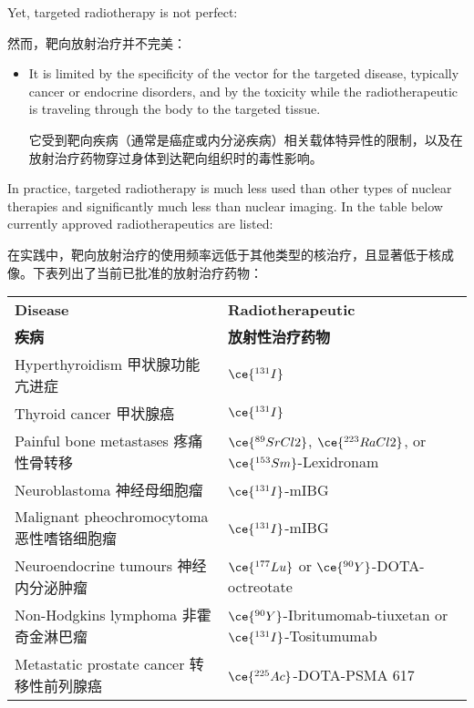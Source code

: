 \documentclass[dvipsnames, svgnames,a4paper,11pt]{article}
\begin{document}
Yet, targeted radiotherapy is not perfect:

然而，靶向放射治疗并不完美：

\begin{itemize}
      \item It is limited by the specificity of the vector for the targeted disease, typically cancer or endocrine disorders, and by the toxicity while the radiotherapeutic is traveling through the body to the targeted tissue.

            它受到靶向疾病（通常是癌症或内分泌疾病）相关载体特异性的限制，以及在放射治疗药物穿过身体到达靶向组织时的毒性影响。

\end{itemize}


In practice, targeted radiotherapy is much less used than other types of nuclear therapies and significantly much less than nuclear imaging. In the table below currently approved radiotherapeutics are listed:

在实践中，靶向放射治疗的使用频率远低于其他类型的核治疗，且显著低于核成像。下表列出了当前已批准的放射治疗药物：

\begin{table*}[htbp]
    \centering
    \begin{tabular}{ll}
    \toprule
    \textbf{Disease} & \textbf{Radiotherapeutic} \\
    \textbf{疾病} & \textbf{放射性治疗药物} \\
    \midrule
    Hyperthyroidism 甲状腺功能亢进症& \(\ce{^{131}I}\) \\
    Thyroid cancer 甲状腺癌& \(\ce{^{131}I}\) \\
    Painful bone metastases 疼痛性骨转移& \(\ce{^{89}SrCl2}\), \(\ce{^{223}RaCl2}\), or \(\ce{^{153}Sm}\)-Lexidronam \\
    Neuroblastoma 神经母细胞瘤& \(\ce{^{131}I}\)-mIBG \\
    Malignant pheochromocytoma 恶性嗜铬细胞瘤& \(\ce{^{131}I}\)-mIBG \\
    Neuroendocrine tumours 神经内分泌肿瘤& \(\ce{^{177}Lu}\) or \(\ce{^{90}Y}\)-DOTA-octreotate \\
    Non-Hodgkins lymphoma 非霍奇金淋巴瘤& \(\ce{^{90}Y}\)-Ibritumomab-tiuxetan or \(\ce{^{131}I}\)-Tositumumab \\
    Metastatic prostate cancer 转移性前列腺癌& \(\ce{^{225}Ac}\)-DOTA-PSMA 617 \\
    \bottomrule
    \end{tabular}
    \end{table*}
\end{document}
